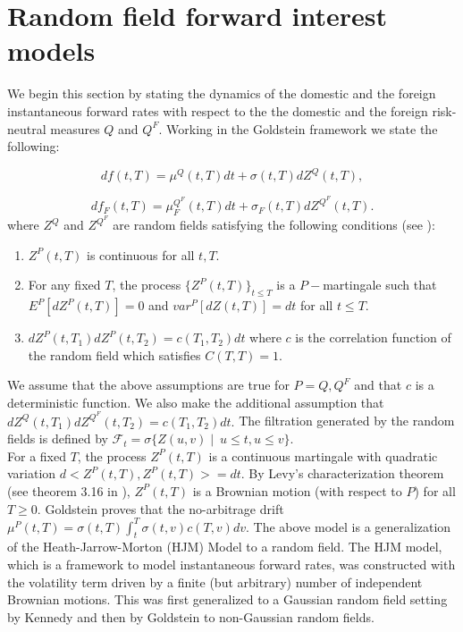 \documentclass[11pt]{article}
\newcommand{\filt}{\ensuremath{\mathcal{F}}}
\begin{document}
\section{Random field forward interest models}

We begin this section by stating the dynamics of the domestic and the foreign instantaneous forward rates with respect to the the domestic and the foreign risk-neutral measures $Q$ and $Q^F$. Working in the Goldstein framework \cite{goldstein2000term} we state the following: 

\begin{equation*}
    df(t,T)=\mu^Q(t,T)dt+\sigma(t,T)dZ^Q(t,T),
\end{equation*}

\begin{equation*}
    df_F(t,T)=\mu_F^{Q^F}(t,T)dt+\sigma_F(t,T)dZ^{Q^F}(t,T).
\end{equation*}
where $Z^{Q}$ and $Z^{Q^F}$ are random fields satisfying the following conditions (see \cite{santa2001dynamics}): 

\begin{enumerate}
    \item $Z^P(t,T)$ is continuous for all $t,T.$
    \item For any fixed $T$, the process $\{Z^P(t,T)\}_{t\leq T}$ is a $P-$martingale such that $E^P[dZ^P(t,T)]=0$ and $var^P[dZ(t,T)]=dt$ for all $t\leq T.$ 
    \item $dZ^P(t,T_1)dZ^P(t,T_2)=c(T_1,T_2)dt$ where $c$ is the correlation function of the random field which satisfies $C(T,T)=1.$
\end{enumerate}
We assume that the above assumptions are true for $P=Q,Q^F$ and that $c$ is a deterministic function. We also make the additional assumption that $dZ^Q(t,T_1)dZ^{Q^F}(t,T_2)=c(T_1,T_2)dt.$ The filtration generated by the random fields is defined by $\filt_t=\sigma\{Z(u,v)\mid\ u\leq t, u\leq v\}$.\\

    For a fixed $T$, the process $Z^P(t,T)$ is a continuous martingale with quadratic variation $d<Z^P(t,T),Z^P(t,T)>=dt.$ By Levy's characterization theorem (see theorem 3.16 in \cite{karatzas}), $Z^P(t,T)$ is a Brownian motion (with respect to $P$) for all $T\geq 0$. Goldstein \cite{goldstein2000term} proves that the no-arbitrage drift $\mu^P(t,T)=\sigma(t,T)\int_t^T \sigma(t,v)c(T,v)dv.$ The above model is a generalization of the Heath-Jarrow-Morton (HJM) Model \cite{heath1992bond} to a random field. The HJM model, which is a framework to model instantaneous forward rates, was  constructed with the volatility term driven by a finite (but arbitrary) number of independent Brownian motions. This was first generalized to a Gaussian random field setting by Kennedy \cite{kennedy1994term} and then by Goldstein \cite{goldstein2000term} to non-Gaussian random fields. \\
\end{document}
